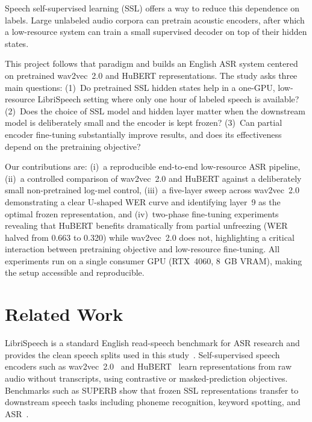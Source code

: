 \documentclass{article}
\begin{document}
Speech self-supervised learning (SSL) offers a way to reduce this dependence on
labels. Large unlabeled audio corpora can pretrain acoustic encoders, after
which a low-resource system can train a small supervised decoder on top of their
hidden states.

This project follows that paradigm and builds an English ASR system centered on
pretrained wav2vec~2.0 and HuBERT representations. The study asks three main
questions: (1)~Do pretrained SSL hidden states help in a one-GPU, low-resource
LibriSpeech setting where only one hour of labeled speech is available?
(2)~Does the choice of SSL model and hidden layer matter when the downstream
model is deliberately small and the encoder is kept frozen?
(3)~Can partial encoder fine-tuning substantially improve results, and does
its effectiveness depend on the pretraining objective?

Our contributions are: (i)~a reproducible end-to-end low-resource ASR pipeline,
(ii)~a controlled comparison of wav2vec~2.0 and HuBERT against a deliberately
small non-pretrained log-mel control, (iii)~a five-layer sweep across
wav2vec~2.0 demonstrating a clear U-shaped WER curve and identifying layer~9 as
the optimal frozen representation, and (iv)~two-phase fine-tuning experiments
revealing that HuBERT benefits dramatically from partial unfreezing (WER halved
from 0.663 to 0.320) while wav2vec~2.0 does not, highlighting a critical
interaction between pretraining objective and low-resource fine-tuning.
All experiments run on a single consumer GPU (RTX~4060, 8~GB VRAM), making the
setup accessible and reproducible.

\section{Related Work}
\label{sec:related}

LibriSpeech is a standard English read-speech benchmark for ASR research and
provides the clean speech splits used in this study~\cite{panayotov2015librispeech}.
Self-supervised speech encoders such as wav2vec~2.0~\cite{baevski2020wav2vec}
and HuBERT~\cite{hsu2021hubert} learn representations from raw audio without
transcripts, using contrastive or masked-prediction objectives. Benchmarks such
as SUPERB show that frozen SSL representations transfer to downstream speech
tasks including phoneme recognition, keyword spotting, and ASR~\cite{yang2021superb}.
\end{document}
